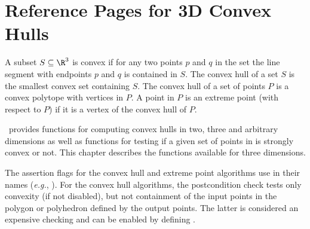 
\clearpage
\section{Reference Pages for 3D Convex Hulls}

A subset $S \subseteq \R^3$ is convex if for any two points $p$ and $q$
in the set the line segment with endpoints $p$ and $q$ is contained
in $S$. The convex hull of a set $S$ is 
the smallest convex set containing
$S$. The convex hull of a set of points $P$ is a convex 
polytope with vertices in $P$.  A point in $P$ is an extreme point 
(with respect to $P$) if it is a vertex 
of the convex hull of $P$.

\cgal\ provides functions for computing convex hulls in two, three 
and arbitrary dimensions as well as functions for testing if a given set of 
points in is strongly convex or not.  This chapter describes the functions
available for three dimensions. 


The assertion flags for the convex hull and extreme point algorithms
use  in their names (\textit{e.g.}, ).
For the convex hull algorithms, the postcondition
check tests only convexity (if not disabled), but not containment of the
input points in the polygon or polyhedron defined by the output points.
The latter is considered an expensive checking and can be enabled by
defining %
.



\\
\\
\\
\\
 \\

